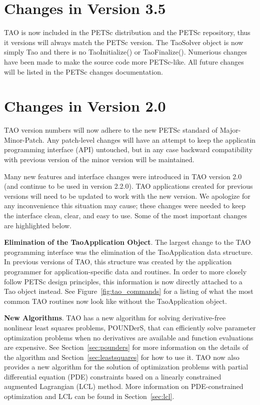 
\section*{Changes in Version 3.5}
TAO is now included in the PETSc distribution and the PETSc
repository, thus it versions will always match the PETSc version. The
TaoSolver object is now simply Tao and there is no TaoInitialize() or
TaoFinalize(). Numerious changes have been made to make the source
code more PETSc-like.  All future changes will be listed in the PETSc changes documentation.

\section*{Changes in Version 2.0}

TAO version numbers will now adhere to the new PETSc standard of 
Major-Minor-Patch. Any patch-level changes will have an attempt to keep the 
applicatin programming interface (API) untouched, but in any case backward 
compatibility with previous version of the minor version will be 
maintained.

Many new features and interface changes were introduced in TAO version 2.0 (and continue to be used in version 2.2.0).
TAO applications created for previous versions will need to be updated to 
work with the new version.  We apologize for any inconvenience this situation
may cause; these changes were needed to keep the interface
clean, 
clear, and easy to use. Some of the most important changes are highlighted 
below.

\vspace{7mm}
\noindent \textbf{Elimination of the TaoApplication Object}. The largest change to the TAO programming interface was the elimination of the
TaoApplication data structure. In previous versions of TAO, this structure was 
created by the application programmer for application-specific data and 
routines.  In order to more closely follow PETSc design principles, this 
information is now directly attached to a Tao object instead.  See 
Figure~\ref{fig:tao_commands} for a listing of what the most common TAO 
routines now look like without the TaoApplication object.

\vspace{7mm}
\noindent \textbf{New Algorithms}. TAO has a new algorithm for solving derivative-free nonlinear least
squares
problems, POUNDerS, that can efficiently solve parameter optimization problems 
when no derivatives are available and function evaluations are expensive. 
See 
Section~\ref{sec:pounders} for more information on the details of the 
algorithm and Section~\ref{sec:leastsquares} for how to use it.
TAO now also provides a new algorithm for the solution of optimization
problems with partial differential equation (PDE) constraints based on a
linearly constrained augmented Lagrangian (LCL) method.  More 
information on PDE-constrained optimization and LCL can be found 
in Section~\ref{sec:lcl}.


